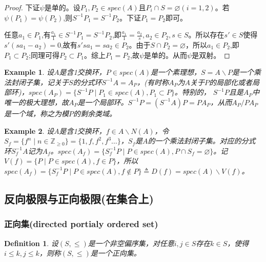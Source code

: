 \documentclass[UTF8]{article}
\newtheorem{defn}{Definition}[section]
\newtheorem{exa}{Example}[section]
\begin{document}
\begin{proof}
	
	下证$\psi$是单的。设$P_1,P_2\in spec(A)$且$P_i\cap S=\varnothing(i=1,2)$。若$\psi(P_1)=\psi(P_2)$,则$S^{-1}P_1=S^{-1}P_2$。下证$P_1=P_2$即可。
	
	任意$a_1\in P_1$,有$\frac{a_1}{1}\in S^{-1}P_1=S^{-1}P_2$,即$\frac{a_1}{1}=\frac{a_2}{s},a_2\in P_2,s\in S$。所以存在$s'\in S$使得$s'(sa_1-a_2)=0$,故有$s'sa_1=sa_2\in P_2$。由于$S\cap P_2=\varnothing$，所以$a_1\in P_2$,即$P_1\subset P_2$;同理可得$P_2\subset P_1$。综上$P_1=P_2$,故$\psi$是单的。从而$\psi$是双射。
	
\end{proof}


\begin{exa}
	设$A$是含1交换环，$P\in spec(A)$是一个素理想，$S=A\backslash P$是一个乘法封闭子集，记关于$S$的分式环$S^{-1}A=A_P$，(有时称$A_P$为$A$关于$P$的局部化或者局部环)，$spec(A_P)=\{S^{-1}P\mid P_1\in spec(A),P_1\subset P\}$。特别的，
	$S^{-1}P$且是$A_P$中唯一的极大理想，故$A_P$是一个局部环。$S^{-1}P=(S^{-1}A)P=PA_P$，从而$A_P/{PA_P}$是一个域，称之为模$P$的剩余类域。
\end{exa}

\begin{exa}
	设$A$是含1交换环，$f\in A\backslash {N(A)}$，令$S_f=\{f^n\mid n\in\mathbb Z_{\geq0}\}=\{1,f,f^2,f^3\dots\}$，$S_f$是$A$的一个乘法封闭子集。对应的分式环$S^{-1}_fA$记为$A_f$。$spec(A_f)=\{S^{-1}_fP\mid P\in spec(A),P\cap S_f=\varnothing\}$。记$V(f)=\{P\mid P\in spec(A),f\in P\}$，所以$spec(A_f)=\{S^{-1}_fP\mid P\in spec(A),f\notin P\}$$\triangleq D(f)=spec(A)\backslash V(f)$。
	
\end{exa}


\subsection{反向极限与正向极限(在集合上)}
\subsubsection{正向集(directed portialy ordered set)}
\begin{defn}
	设$(S,\leq)$是一个非空偏序集，对任意$i,j\in S$存在$k\in S$，使得$i\leq k,j\leq k$，则称$(S,\leq)$是一个正向集。
\end{defn}
\end{document}
